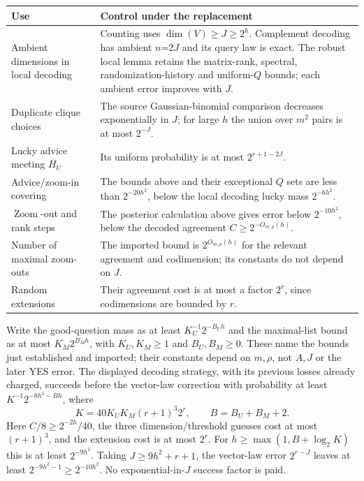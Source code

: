 \begin{longtable}{@{}p{}p{}@{}}\toprule
\textbf{Use} & \textbf{Control under the replacement}\\\midrule\endhead
Ambient dimensions in local decoding & Counting uses \(\dim(V)\)\(\ge\)\(J\)\(\ge\)\(2^h\). Complement decoding has ambient \(n\)=2\(J\) and its query law is exact. The robust local lemma retains the matrix-rank, spectral, randomization-history and uniform-\(Q\) bounds; each ambient error improves with \(J\).\\[5pt]
Duplicate clique choices & The source Gaussian-binomial comparison decreases exponentially in \(J\); for large \(h\) the union over \(m^2\) pairs is at most \(2^{-J}\).\\[5pt]
Lucky advice meeting \(H_U\) & Its uniform probability is at most \(2^{r+1-2J}\).\\[5pt]
Advice/zoom-in covering & The bounds above and their exceptional \(Q\) sets are less than \(2^{-20h^2}\), below the local decoding lucky mass \(2^{-6h^2}\).\\[5pt]
\(\operatorname{Zoom}\)-out and rank steps & The posterior calculation above gives error below \(2^{-10h^2}\), below the decoded agreement \(C\)\(\ge\)\(2^{-O_{m,\rho}(h)}\).\\[5pt]
Number of maximal zoom-outs & The imported bound is \(2^{O_{m,\rho}(h)}\) for the relevant agreement and codimension; its constants do not depend on \(J\).\\[5pt]
Random extensions & Their agreement cost is at most a factor \(2^r\), since codimensions are bounded by \(r\).\\[5pt]
\bottomrule\end{longtable}

Write the good-question mass as at least $K_U^{-1}2^{-B_Uh}$ and the
maximal-list bound as at most $K_M2^{B_Mh}$, with $K_U,K_M\ge1$ and
$B_U,B_M\ge0$. These name the bounds just established and imported;
their constants depend on $m,\rho$, not $A,J$ or the later YES error.
The displayed decoding strategy, with its previous losses already
charged, succeeds before the vector-law correction with probability
at least $K^{-1}2^{-8h^2-Bh}$, where
\[
 K=40K_UK_M(r+1)^3 2^r,\qquad B=B_U+B_M+2.
\]
Here $C/8\ge2^{-2h}/40$, the three dimension/threshold guesses cost
at most $(r+1)^3$, and the extension cost is at most $2^r$.
For $h\ge\max(1,B+\log_2K)$ this is at least $2^{-9h^2}$.
Taking $J\ge9h^2+r+1$, the vector-law error $2^{r-J}$ leaves at
least $2^{-9h^2-1}\ge2^{-10h^2}$. No exponential-in-$J$ success
factor is paid.


